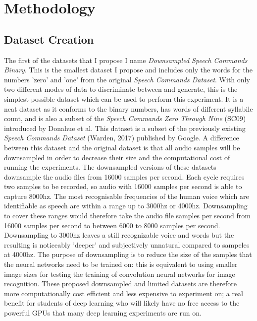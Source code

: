 \documentclass[titlepage]{article}
\begin{document}
\section{Methodology}

\subsection{Dataset Creation}

The first of the datasets that I propose I name \textit{Downsampled Speech Commands Binary}.
This is the smallest dataset I propose and includes only the words for the numbers 'zero' and 'one' from the original \textit{Speech Commands Dataset}.
With only two different modes of data to discriminate between and generate, this is the simplest possible dataset which can be used to perform this experiment.
It is a neat dataset as it conforms to the binary numbers, has words of different syllabile count, and is also a subset of the \textit{Speech Commands Zero Through Nine} (SC09) introduced by Donahue et al.
\newline
\newline
This dataset is a subset of the previously existing \textit{Speech Commands Dataset} (Warden, 2017) published by Google.
A difference between this dataset and the original dataset is that all audio samples will be downsampled in order to decrease their size and the computational cost of running the experiments.
\newline
\newline
The downsampled versions of these datasets downsample the audio files from 16000 samples per second.
Each cycle requires two samples to be recorded, so audio with 16000 samples per second is able to capture 8000hz.
The most recognisable frequencies of the human voice which are identifiable as speech are within a range up to 3000hz or 4000hz.
Downsampling to cover these ranges would therefore take the audio file samples per second from 16000 samples per second to between 6000 to 8000 samples per second.
Downsampling to 3000hz leaves a still recognizable voice and words but the resulting is noticeably 'deeper' and subjectively unnatural compared to sampeles at 4000hz.
\newline
\newline
The purpose of downsampling is to reduce the size of the samples that the neural networks need to be trained on: this is equivalent to using smaller image sizes for testing the training of convolution neural networks for image recognition.
These proposed downsampled and limited datasets are therefore more computationally cost efficient and less expensive to experiment on; a real benefit for students of deep learning who will likely have no free access to the powerful GPUs that many deep learning experiments are run on.
\end{document}
